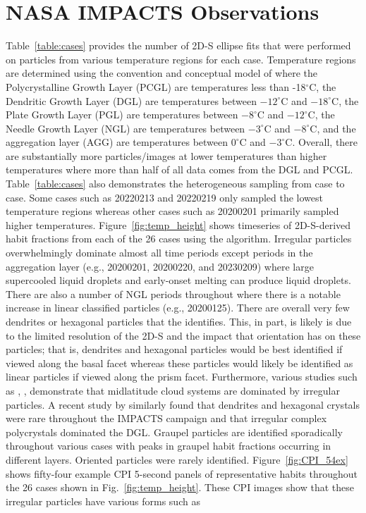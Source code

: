 \documentclass[amt, manuscript]{copernicus}
\begin{document}
\section{NASA IMPACTS Observations}\label{sect:obs}

Table~\ref{table:cases} provides the number of 2D-S ellipse fits that were performed on particles from various temperature regions for each case. Temperature regions are determined using the convention and conceptual model of \citet{Varcie2023} where the Polycrystalline Growth Layer (PCGL) are temperatures less than -18$^{\circ}$C, the Dendritic Growth Layer (DGL) are temperatures between $-12^{\circ}$C and $-18^{\circ}$C, the Plate Growth Layer (PGL) are temperatures between $-8^{\circ}$C and $-12^{\circ}$C, the Needle Growth Layer (NGL) are temperatures between $-3^{\circ}$C and $-8^{\circ}$C, and the aggregation layer (AGG) are temperatures between $0^{\circ}$C and $-3^{\circ}$C. Overall, there are substantially more particles/images at lower temperatures than higher temperatures where more than half of all data comes from the DGL and PCGL. Table~\ref{table:cases} also demonstrates the heterogeneous sampling from case to case. Some cases such as 20220213 and 20220219 only sampled the lowest temperature regions whereas other cases such as 20200201 primarily sampled higher temperatures. Figure~\ref{fig:temp_height} shows timeseries of 2D-S-derived habit fractions from each of the 26 cases using the \citet{Schima2024} algorithm. Irregular particles overwhelmingly dominate almost all time periods except periods in the aggregation layer (e.g., 20200201, 20200220, and 20230209) where large supercooled liquid droplets and early-onset melting can produce liquid droplets. There are also a number of NGL periods throughout where there is a notable increase in linear classified particles (e.g., 20200125). There are overall very few dendrites or hexagonal particles that the \citet{Schima2024} identifies. This, in part, is likely is due to the limited resolution of the 2D-S and the impact that orientation has on these particles; that is, dendrites and hexagonal particles would be best identified if viewed along the basal facet whereas these particles would likely be identified as linear particles if viewed along the prism facet. Furthermore, various studies such as \citet{Korolev2000}, \citet{Korolev2003}, \citet{Dunnavan2022} demonstrate that midlatitude cloud systems are dominated by irregular particles. A recent study by \citet{Garcia2026} similarly found that dendrites and hexagonal crystals were rare throughout the IMPACTS campaign and that irregular complex polycrystals dominated the DGL.  Graupel particles are identified sporadically throughout various cases with peaks in graupel habit fractions occurring in different layers. Oriented particles were rarely identified. Figure~\ref{fig:CPI_54ex} shows fifty-four example CPI 5-second panels of representative habits throughout the 26 cases shown in Fig.~\ref{fig:temp_height}. These CPI images show that these irregular particles have various forms such as 
\end{document}
